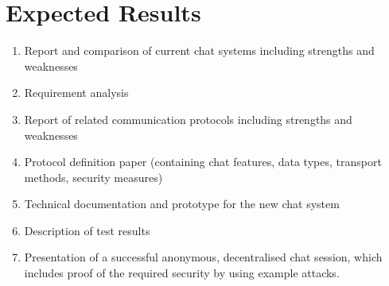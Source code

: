 \section{Expected Results}
\begin{enumerate}
\item Report and comparison of current chat systems including strengths and weaknesses
\item Requirement analysis
\item Report of related communication protocols including strengths and weaknesses
\item Protocol definition paper (containing chat features, data types, transport methods, security measures)
\item Technical documentation and prototype for the new chat system
\item Description of test results
\item Presentation of a successful anonymous, decentralised chat session, which includes proof of the required security by using example attacks.
\end{enumerate}
